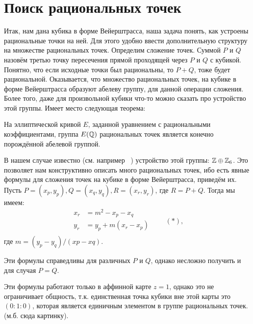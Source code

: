 \section*{Поиск рациональных точек}


Итак, нам дана кубика в форме Вейерштрасса, наша задача понять, как устроены
рациональные точки на ней. Для этого удобно ввести дополнительную структуру на
множестве рациональных точек. Определим сложение точек.  Суммой \(P\) и \(Q\)
назовём третью точку пересечения прямой проходящей через \(P\) и \(Q\) с
кубикой. Понятно, что если исходные точки был рациональны, то \(P + Q\), тоже
будет рациональной.  Оказывается, что множество рациональных точек, на кубике
в форме Вейерштрасса образуют абелеву группу, для данной операции сложения.
Более того, даже для произвольной кубики что-то можно сказать про устройство
этой группы. Имеет место следующая теорема:

\begin{theoremf}
    На эллиптической кривой \(E\), заданной уравнением с рациональными
    коэффициентами, группа \(E(\mathbb{Q})\) рациональных точек является
    конечно порождённой абелевой группой.
\end{theoremf}

В нашем случае известно (см. например ~\cite{unus_rep_prob}) устройство этой группы:
\(\mathbb{Z} \oplus \mathbb{Z}_6\). Это позволяет нам конструктивно описать много
рациональных точек, ибо есть явные формулы для сложения точек на кубике в форме
Вейерштрасса, приведём их. Пусть \(P = (x_{p}, y_{p}), Q = (x_{q}, y_{q}), R =
(x_{r}, y_{r})\), где \(R = P + Q\). Тогда мы имеем:
\[
\begin{aligned}
    x_r &= m^2 - x_p - x_q \\
    y_r &= y_p + m(x_r - x_p) \\
\end{aligned} \qquad (*)
,\] 
где \(m = (y_{p} - y_{q}) / (x{p} - x{q})\).


\begin{remark}
    Эти формулы справедливы для различных \(P\) и \(Q\), однако несложно получить и
    для случая \(P = Q\).
\end{remark}

\begin{remark}
    Эти формулы работают только в аффинной карте \(z = 1\), однако это не
    ограничивает общность, т.к. единственная точка кубики вне этой карты это
    \((0 : 1 : 0)\), которая является единичным элементом в группе рациональных точек. (м.б.
    сюда картинку).
\end{remark}

